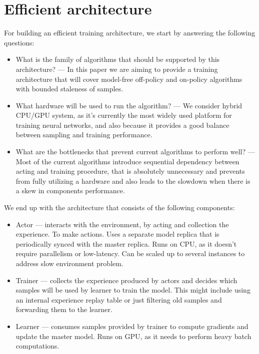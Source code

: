 \section{Efficient architecture}

For building an efficient training architecture, we start by answering the following questions:

\begin{itemize}
    \item What is the family of algorithms that should be supported by this architecture? --- In
    this paper we are aiming to provide a training architecture that will cover model-free
    off-policy and on-policy algorithms with bounded staleness of samples.

    \item What hardware will be used to run the algorithm? --- We consider hybrid CPU/GPU system,
    as it's currently the most widely used platform for training neural networks, and also because
    it provides a good balance between sampling and training performance.

    \item What are the bottlenecks that prevent current algorithms to perform well? --- Most of the
    current algorithms introduce sequential dependency between acting and training procedure, that
    is absolutely unnecessary and prevents from fully utilizing a hardware and also leads to the
    slowdown when there is a skew in components performance.
\end{itemize}

We end up with the architecture that consists of the following components:
\begin{itemize}
    \item Actor --- interacts with the environment, by acting and collection the experience. To
        make actions. Uses a separate model replica that is periodically synced with the master replica.
        Runs on CPU, as it doesn't require parallelism or low-latency. Can be scaled up to several
        instances to address slow environment problem.

    \item Trainer --- collects the experience produced by actors and decides which samples will be
        used by learner to train the model. This might include using an internal experience replay
        table or just filtering old samples and forwarding them to the learner.

    \item Learner --- consumes samples provided by trainer to compute gradients and update the
        master model. Runs on GPU, as it needs to perform heavy batch computations.
\end{itemize}

